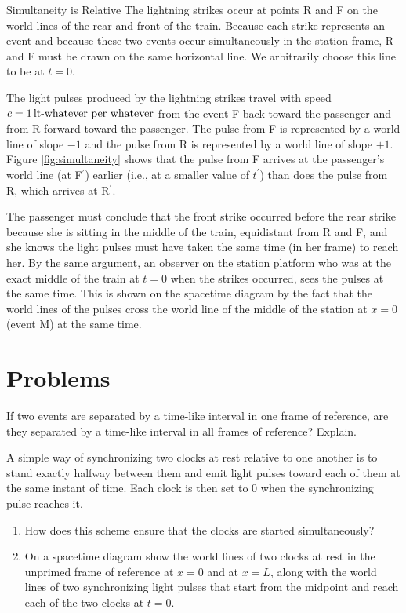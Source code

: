 \begin{example}{Simultaneity is Relative}
The lightning strikes occur at points R and F on the world lines of 
the rear and front of the train.  Because each strike represents an 
event and because these two events occur simultaneously in the 
station frame, R and F must be drawn on the same horizontal line.  
We arbitrarily choose this line to be at $t = 0$.

The light pulses produced by the lightning strikes travel with speed
$c = 1\,\mbox{lt-whatever per whatever}$ from the event F back toward
the passenger and from R forward toward the passenger.  The pulse from
F is represented by a world line of slope $-1$ and the pulse from R is
represented by a world line of slope $+1$.  Figure
\ref{fig:simultaneity} shows that the pulse from F arrives at the
passenger's world line (at F$^\prime$) earlier (i.e., at a smaller
value of $t^\prime$) than does the pulse from R, which arrives at
R$^\prime$.

The passenger must conclude that the front strike occurred before 
the rear strike because she is sitting in the middle of the train, 
equidistant from R and F, and she knows the light pulses must have 
taken the same time (in her frame) to reach her.  By the same 
argument, an observer on the station platform who was at the exact 
middle of the train at $t = 0$ when the strikes occurred, sees the 
pulses at the same time.  This is shown on the spacetime diagram 
by the fact that the world lines of the pulses cross the world line of 
the middle of the station at $x = 0$ (event M) at the same time.
\label{example:simultaneity}
\end{example}

\newpage

\section*{Problems}

\begin{problem}
If two events are separated by a time-like interval in one
frame of reference, are they separated by a time-like interval in all
frames of reference?  Explain.
\end{problem}

\begin{problem}
A simple way of synchronizing two clocks at rest relative to one
another is to stand exactly halfway between them and emit light pulses
toward each of them at the same instant of time.  Each clock is then
set to 0 when the synchronizing pulse reaches it.
  \begin{enumerate}
  \item How does this scheme ensure that the clocks are started
    simultaneously?  
  \item On a spacetime diagram show the world lines of two
    clocks at rest in the unprimed frame of reference at $x = 0$ and at $x =
    L$, along with the world lines of two synchronizing light pulses that
    start from the midpoint and reach each of the two clocks at $t = 0.$
  \end{enumerate}
\label{prob:synchronizeB}
\end{problem}


